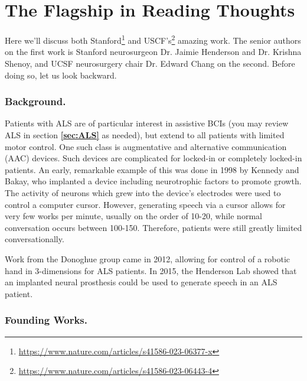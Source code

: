 \section{The Flagship in Reading Thoughts}

Here we'll discuss both Stanford\footnote{\url{https://www.nature.com/articles/s41586-023-06377-x}} and USCF's\footnote{\url{https://www.nature.com/articles/s41586-023-06443-4}} amazing work. The senior authors on the first work is Stanford neurosurgeon Dr. Jaimie Henderson and Dr. Krishna Shenoy, and UCSF neurosurgery chair Dr. Edward Chang on the second. Before doing so, let us look backward. 

\subsubsection{Background.}

Patients with ALS are of particular interest in assistive BCIs (you may review ALS in section \textbf{\ref{sec:ALS}} as needed), but extend to all patients with limited motor control. One such class is augmentative and alternative communication (AAC) devices. Such devices are complicated for locked-in or completely locked-in patients. An early, remarkable example of this was done in 1998 by Kennedy and Bakay, who implanted a device including neurotrophic factors to promote growth. The activity of neurons which grew into the device's electrodes were used to control a computer cursor. However, generating speech via a cursor allows for very few works per minute, usually on the order of 10-20, while normal conversation occurs between 100-150. Therefore, patients were still greatly limited conversationally. \newline

Work from the Donoghue group came in 2012, allowing for control of a robotic hand in 3-dimensions for ALS patients. In 2015, the Henderson Lab showed that an implanted neural prosthesis could be used to generate speech in an ALS patient. 

\subsubsection{Founding Works.}

